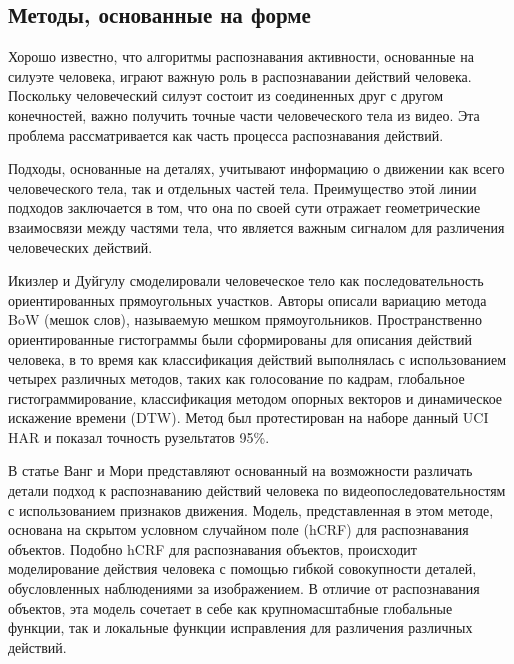 \subsection{Методы, основанные на форме}

Хорошо известно, что алгоритмы распознавания активности, основанные на силуэте человека, играют важную роль в распознавании действий человека. Поскольку человеческий силуэт состоит из соединенных друг с другом конечностей, важно получить точные части человеческого тела из видео. Эта проблема рассматривается как часть процесса распознавания действий. 

Подходы, основанные на деталях, учитывают информацию о движении
как всего человеческого тела, так и отдельных частей тела.
Преимущество этой линии подходов заключается в том, что она по своей сути отражает геометрические взаимосвязи между частями тела, что является важным сигналом для различения человеческих действий. 



Икизлер и Дуйгулу \cite{form3} смоделировали человеческое тело как последовательность ориентированных прямоугольных участков. Авторы описали вариацию метода BoW (мешок слов), называемую мешком прямоугольников. \clearpage Пространственно ориентированные гистограммы были сформированы для описания действий человека, в то время как классификация действий выполнялась с использованием четырех различных методов, таких как голосование по кадрам, глобальное гистограммирование, классификация методом опорных векторов и динамическое искажение времени (DTW).  Метод был протестирован на наборе данный UCI HAR и показал точность рузельтатов 95\%.


В статье \cite{form2}  Ванг и Мори представляют основанный на возможности различать детали подход к распознаванию действий человека по видеопоследовательностям с использованием признаков движения. Модель, представленная в этом методе, основана на скрытом условном случайном поле (hCRF) для распознавания объектов. Подобно hCRF для распознавания объектов, происходит моделирование действия человека с помощью гибкой совокупности деталей, обусловленных наблюдениями за изображением. В отличие от распознавания объектов, эта модель сочетает в себе как крупномасштабные глобальные функции, так и локальные функции исправления
для различения различных действий. 

